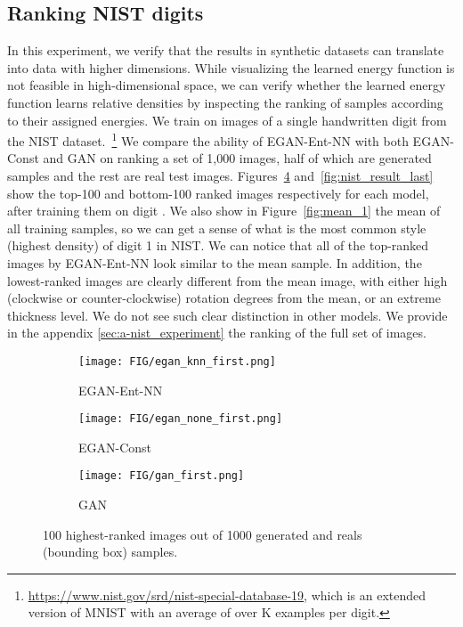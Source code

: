 \documentclass[a4paper]{article}
\begin{document}
\subsection{Ranking NIST digits}
In this experiment, we verify that the results in synthetic datasets can translate into data with higher dimensions. 
While visualizing the learned energy function is not feasible in high-dimensional space, we can verify whether the learned energy function learns relative densities by inspecting the ranking of samples according to their assigned energies. 
We train on  images of a single handwritten digit from the NIST dataset.~\footnote{\url{https://www.nist.gov/srd/nist-special-database-19}, which is an extended version of MNIST with an average of over K examples per digit.} 
We compare the ability of EGAN-Ent-NN with both EGAN-Const and GAN on ranking a set of 1,000 images, half of which are generated samples and the rest are real test images. 
Figures~\ref{fig:nist_result_first} and~\ref{fig:nist_result_last} show the top-100 and bottom-100 ranked images respectively for each model, after training them on digit . 
We also show in Figure~\ref{fig:mean_1} the mean of all training samples, so we can get a sense of what is the most common style (highest density) of digit 1 in NIST. 
We can notice that all of the top-ranked images by EGAN-Ent-NN look similar to the mean sample. 
In addition, the lowest-ranked images are clearly different from the mean image, with either high (clockwise or counter-clockwise) rotation degrees from the mean, or an extreme thickness level. We do not see such clear distinction in other models. We provide in the appendix \ref{sec:a-nist_experiment} the ranking of the full set of images.

\begin{figure}[t!]
  \begin{subfigure}[b]{\linewidth}
    \texttt{[image: FIG/egan\_knn\_first.png]}
    \caption{EGAN-Ent-NN}
    \label{fig:nist_egan_knn_first}
  \end{subfigure}
  \hfill
  \begin{subfigure}[b]{\linewidth}
    \texttt{[image: FIG/egan\_none\_first.png]}
    \caption{EGAN-Const}
    \label{fig:nist_egan_none_first}
  \end{subfigure}
  \hfill
  \begin{subfigure}[b]{\linewidth}
    \texttt{[image: FIG/gan\_first.png]}
    \caption{GAN}
    \label{fig:nist_gan_first}
  \end{subfigure}
  \caption{100 highest-ranked images out of 1000 generated and reals (bounding box) samples. }
 \label{fig:nist_result_first}
\vspace{-0.6em}
\end{figure}
\end{document}
